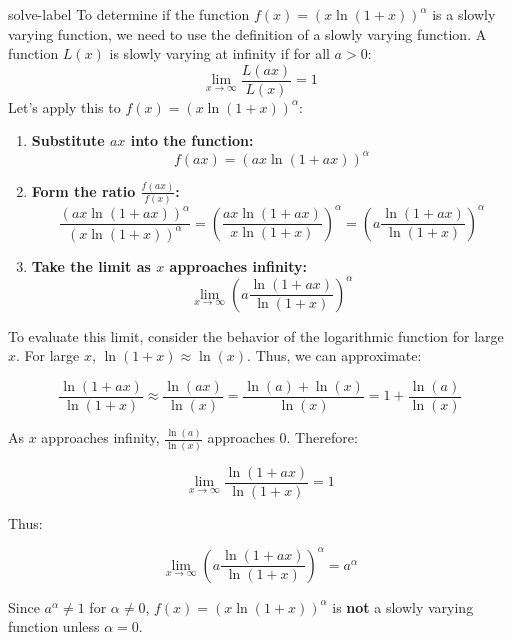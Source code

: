 	\begin{solve}{}{solve-label}
		To determine if the function \( f(x) = (x \ln(1+x))^\alpha \) is a slowly varying function, we need to use the definition of a slowly varying function. A function \( L(x) \) is slowly varying at infinity if for all \( a > 0 \):
		$$ \lim_{x \to \infty} \frac{L(ax)}{L(x)} = 1 $$
		Let's apply this to \( f(x) = (x \ln(1+x))^\alpha \):
		\begin{enumerate}
			
			\item \textbf{Substitute \( ax \) into the function:}
			$$f(ax) = (ax \ln(1+ax))^\alpha$$
			
			\item \textbf{Form the ratio \( \frac{f(ax)}{f(x)} \):}
			$$\frac{(ax \ln(1+ax))^\alpha}{(x \ln(1+x))^\alpha} = \left( \frac{ax \ln(1+ax)}{x \ln(1+x)} \right)^\alpha = \left( a \frac{\ln(1+ax)}{\ln(1+x)} \right)^\alpha$$
			
			\item \textbf{Take the limit as \( x \) approaches infinity:}
			$$\lim_{x \to \infty} \left( a \frac{\ln(1+ax)}{\ln(1+x)} \right)^\alpha$$
		\end{enumerate}
		
		
	
		To evaluate this limit, consider the behavior of the logarithmic function for large \( x \). For large \( x \), \( \ln(1+x) \approx \ln(x) \). Thus, we can approximate:
		
		\[
		\frac{\ln(1+ax)}{\ln(1+x)} \approx \frac{\ln(ax)}{\ln(x)} = \frac{\ln(a) + \ln(x)}{\ln(x)} = 1 + \frac{\ln(a)}{\ln(x)}
		\]
		
		As \( x \) approaches infinity, \( \frac{\ln(a)}{\ln(x)} \) approaches 0. Therefore:
		
		\[
		\lim_{x \to \infty} \frac{\ln(1+ax)}{\ln(1+x)} = 1
		\]
		
		Thus:
		
		\[
		\lim_{x \to \infty} \left( a \frac{\ln(1+ax)}{\ln(1+x)} \right)^\alpha = a^\alpha
		\]
		
		Since \( a^\alpha \neq 1 \) for \( \alpha \neq 0 \), \( f(x) = (x \ln(1+x))^\alpha \) is \textbf{not} a slowly varying function unless \( \alpha = 0 \). \cite{r1,r2,r3,r4,r5,r6,r7,r8,r9,r10,r11}
	\end{solve}
	
	
	
	
	
